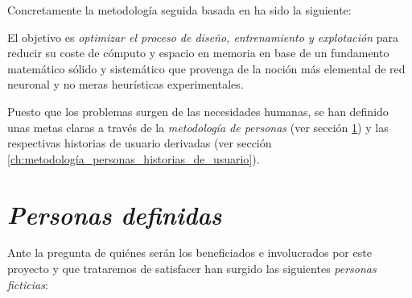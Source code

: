 Concretamente la metodología seguida basada en \cite{que-es-un-trabajo-fin-de-x} ha sido la siguiente: 


El objetivo es \textit{optimizar el proceso de diseño, entrenamiento y explotación}
para reducir su coste de cómputo 
y espacio en memoria en base de
un fundamento matemático sólido y sistemático que provenga de
la noción más elemental de red neuronal y no meras heurísticas experimentales.

Puesto que los problemas surgen de las necesidades humanas,
se han definido unas metas claras a través de la \textit{metodología de personas} 
(ver sección \ref{ch:metodología_personas}) \cite{personas-why-and-how-you-should-use-them}
y las respectivas historias de usuario derivadas (ver sección \ref{ch:metodología_personas_historias_de_usuario}).   

\section{\textit{Personas definidas}}  \label{ch:metodología_personas}

Ante la pregunta de quiénes serán los beneficiados e involucrados por este proyecto y que trataremos de satisfacer
han surgido 
las siguientes \textit{personas ficticias}:

